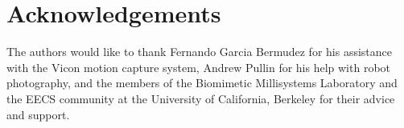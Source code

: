 \documentclass{aamas2013}
\begin{document}
\section{Acknowledgements}
The authors would like to thank Fernando Garcia Bermudez for his 
assistance with the Vicon motion capture system, Andrew Pullin for his 
help with robot photography, and the members of the Biomimetic 
Millisystems Laboratory and the EECS community at the University of 
California, Berkeley for their advice and support.~\cite{bowman:reasoning}





\end{document}
